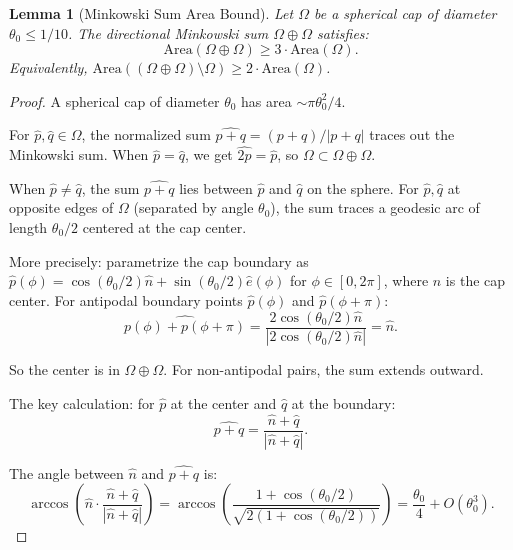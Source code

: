 \documentclass[11pt]{article}
\newtheorem{lemma}[theorem]{Lemma}
\theoremstyle{definition}
\begin{document}
\begin{lemma}[Minkowski Sum Area Bound]\label{lem:minkowski-area}
Let $\Omega$ be a spherical cap of diameter $\theta_0 \leq 1/10$. The directional Minkowski sum $\Omega \oplus \Omega$ satisfies:
\begin{equation}
\text{Area}(\Omega \oplus \Omega) \geq 3 \cdot \text{Area}(\Omega).
\end{equation}
Equivalently, $\text{Area}((\Omega \oplus \Omega) \setminus \Omega) \geq 2 \cdot \text{Area}(\Omega)$.
\end{lemma}

\begin{proof}
A spherical cap of diameter $\theta_0$ has area $\sim \pi\theta_0^2/4$.

For $\hat{p}, \hat{q} \in \Omega$, the normalized sum $\widehat{p+q} = (p+q)/|p+q|$ traces out the Minkowski sum. When $\hat{p} = \hat{q}$, we get $\widehat{2p} = \hat{p}$, so $\Omega \subset \Omega \oplus \Omega$.

When $\hat{p} \neq \hat{q}$, the sum $\widehat{p+q}$ lies between $\hat{p}$ and $\hat{q}$ on the sphere. For $\hat{p}, \hat{q}$ at opposite edges of $\Omega$ (separated by angle $\theta_0$), the sum traces a geodesic arc of length $\theta_0/2$ centered at the cap center.

More precisely: parametrize the cap boundary as $\hat{p}(\phi) = \cos(\theta_0/2)\hat{n} + \sin(\theta_0/2)\hat{e}(\phi)$ for $\phi \in [0, 2\pi]$, where $\hat{n}$ is the cap center. For antipodal boundary points $\hat{p}(\phi)$ and $\hat{p}(\phi + \pi)$:
\begin{equation}
\widehat{p(\phi) + p(\phi+\pi)} = \frac{2\cos(\theta_0/2)\hat{n}}{|2\cos(\theta_0/2)\hat{n}|} = \hat{n}.
\end{equation}

So the center is in $\Omega \oplus \Omega$. For non-antipodal pairs, the sum extends outward.

The key calculation: for $\hat{p}$ at the center and $\hat{q}$ at the boundary:
\begin{equation}
\widehat{p + q} = \frac{\hat{n} + \hat{q}}{|\hat{n} + \hat{q}|}.
\end{equation}

The angle between $\hat{n}$ and $\widehat{p+q}$ is:
\begin{equation}
\arccos\left(\hat{n} \cdot \frac{\hat{n} + \hat{q}}{|\hat{n} + \hat{q}|}\right) = \arccos\left(\frac{1 + \cos(\theta_0/2)}{\sqrt{2(1 + \cos(\theta_0/2))}}\right) = \frac{\theta_0}{4} + O(\theta_0^3).
\end{equation}


\end{proof}
\end{document}
